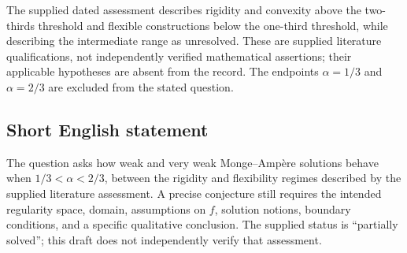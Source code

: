 \documentclass[11pt]{article}
\begin{document}
The supplied dated assessment describes rigidity and convexity above the two-thirds threshold and flexible constructions below the one-third threshold, while describing the intermediate range as unresolved. These are supplied literature qualifications, not independently verified mathematical assertions; their applicable hypotheses are absent from the record. The endpoints \(\alpha=1/3\) and \(\alpha=2/3\) are excluded from the stated question.
\subsection{Short English statement}
The question asks how weak and very weak Monge--Amp\`ere solutions behave when \(1/3<\alpha<2/3\), between the rigidity and flexibility regimes described by the supplied literature assessment. A precise conjecture still requires the intended regularity space, domain, assumptions on \(f\), solution notions, boundary conditions, and a specific qualitative conclusion. The supplied status is ``partially solved''; this draft does not independently verify that assessment.
\end{document}
